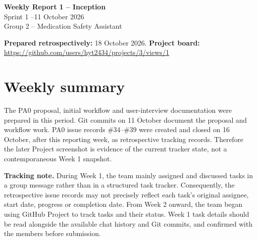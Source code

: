 

\begin{center}
{\Large\bfseries Weekly Report 1 -- Inception}\\[3pt]
Sprint 1 --11 October 2026\\
Group 2 -- Medication Safety Assistant
\end{center}
\textbf{Prepared retrospectively:} 18 October 2026. \textbf{Project board:} \url{https://github.com/users/hyt2434/projects/3/views/1}

\section{Weekly summary}
The PA0 proposal, initial workflow and user-interview documentation were prepared in this period. Git commits on 11 October document the proposal and workflow work. PA0 issue records \#34--\#39 were created and closed on 16 October, after this reporting week, as retrospective tracking records. Therefore the later Project screenshot is evidence of the current tracker state, not a contemporaneous Week 1 snapshot.

\textbf{Tracking note.} During Week 1, the team mainly assigned and discussed tasks in a group message rather than in a structured task tracker. Consequently, the retrospective issue records may not precisely reflect each task's original assignee, start date, progress or completion date. From Week 2 onward, the team began using GitHub Project to track tasks and their status. Week 1 task details should be read alongside the available chat history and Git commits, and confirmed with the members before submission.


